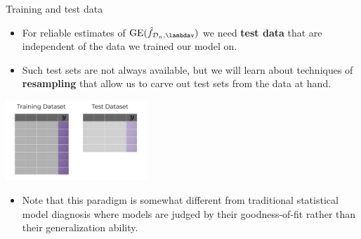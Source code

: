 \documentclass[11pt,compress,t,notes=noshow, xcolor=table]{beamer}
\begin{document}
\begin{vbframe}{Training and test data}

\begin{itemize}
  \item For reliable estimates of $\mathrm{GE}(\fh_{\D_n, \lambdav})$ we need 
  \textbf{test data} that are independent of the data we trained our model on.
  \item Such test sets are not always available, but we will learn about 
  techniques of \textbf{resampling} that allow us to carve out test sets from 
  the data at hand.
\end{itemize}

\begin{center}
  \includegraphics[width=0.4\textwidth]{figure_man/train-test-data.jpg}
\end{center}

\begin{itemize}
  \item Note that this paradigm is somewhat different from traditional 
  statistical model diagnosis where models are judged by their goodness-of-fit 
  rather than their generalization ability.
\end{itemize}

\end{vbframe}


\endlecture
\end{document}
